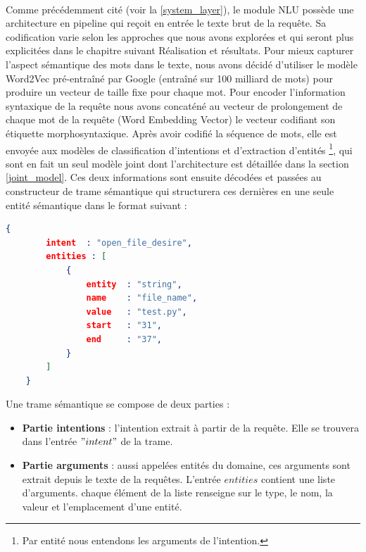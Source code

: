 	\paragraph{}
	\label{encoding}
	Comme précédemment cité (voir la \ref{system_layer}), le module NLU possède une architecture en pipeline qui reçoit en entrée le texte brut de la requête. Sa codification varie selon les approches que nous avons explorées et qui seront plus explicitées dans le chapitre suivant Réalisation et résultats. Pour mieux capturer l'aspect sémantique des mots dans le texte, nous avons décidé d'utiliser le modèle Word2Vec pré-entraîné par Google (entraîné sur 100 milliard de mots) pour produire un vecteur de taille fixe pour chaque mot. Pour encoder l'information syntaxique de la requête nous avons concaténé au vecteur de prolongement de chaque mot de la requête (Word Embedding Vector) le vecteur codifiant son étiquette morphosyntaxique. Après avoir codifié la séquence de mots, elle est envoyée aux modèles de classification d'intentions et d'extraction d'entités \footnote{Par entité nous entendons les arguments de l'intention.}, qui sont en fait un seul modèle joint dont l'architecture est détaillée dans la section \ref{joint_model}. Ces deux informations sont ensuite décodées et passées au constructeur de trame sémantique qui structurera ces dernières en une seule entité sémantique dans le format suivant : 
	\newpage
	\begin{lstlisting}[language=json]
	{
		intent  : "open_file_desire",
		entities : [
			{	
				entity	: "string",
				name	: "file_name",
				value	: "test.py",
				start	: "31",
				end		: "37",
			}
		]
	}
	\end{lstlisting}
	\par
	Une trame sémantique se compose de deux parties :
	\begin{itemize}
		\item \textbf{Partie intentions} : l'intention extrait à partir de la requête. Elle se trouvera dans l'entrée $"intent"$ de la trame.
		\item \textbf{Partie arguments} : aussi appelées entités du domaine, ces arguments sont extrait depuis le texte de la requêtes. L'entrée $entities$ contient une liste d'arguments. chaque élément de la liste renseigne sur le type, le nom, la valeur et l'emplacement d'une entité.
	\end{itemize}
